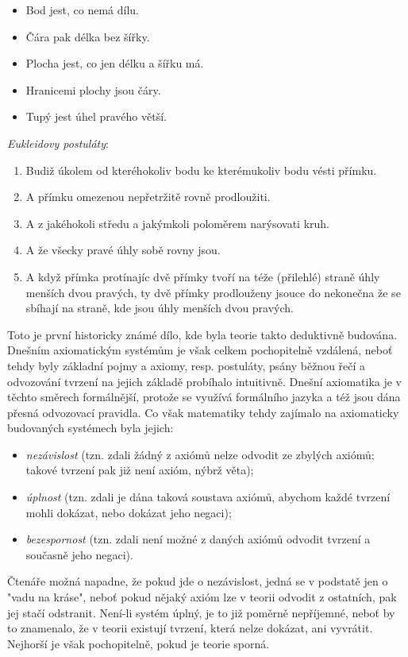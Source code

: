 \begin{itemize}
\item Bod jest, co nemá dílu.
\item Čára pak délka bez šířky.
\item Plocha jest, co jen délku a šířku má.
\item Hranicemi plochy jsou čáry.
\item Tupý jest úhel pravého větší.
\end{itemize}
\noindent \emph{Eukleidovy postuláty}:
\begin{enumerate}[label=(\roman*)]
\item Budiž úkolem od kteréhokoliv bodu ke kterémukoliv bodu vésti přímku.
\item A přímku omezenou nepřetržitě rovně prodloužiti.
\item A z jakéhokoli středu a jakýmkoli poloměrem narýsovati kruh.
\item A že všecky pravé úhly sobě rovny jsou.
\item A když přímka protínajíc dvě přímky tvoří na téže (přilehlé) straně úhly menších dvou pravých, ty dvě přímky prodlouženy jsouce do nekonečna že se sbíhají na straně, kde jsou úhly menších dvou pravých.
\end{enumerate}
Toto je první historicky známé dílo, kde byla teorie takto deduktivně budována. Dnešním axiomatickým systémům je však celkem pochopitelně vzdálená, neboť tehdy byly základní pojmy a axiomy, resp. postuláty, psány běžnou řečí a odvozování tvrzení na jejich základě probíhalo intuitivně. Dnešní axiomatika je v těchto směrech formálnější, protože se využívá formálního jazyka a též jsou dána přesná odvozovací pravidla. Co však matematiky tehdy zajímalo na axiomaticky budovaných systémech byla jejich:
\begin{itemize}
\item \emph{nezávislost} (tzn. zdali žádný z axiómů nelze odvodit ze zbylých axiómů; takové tvrzení pak již není axióm, nýbrž věta);
\item \emph{úplnost} (tzn. zdali je dána taková soustava axiómů, abychom každé tvrzení mohli dokázat, nebo dokázat jeho negaci);
\item \emph{bezespornost} (tzn. zdali není možné z daných axiómů odvodit tvrzení a současně jeho negaci).
\end{itemize}
Čtenáře možná napadne, že pokud jde o nezávislost, jedná se v podstatě jen o "vadu na kráse", neboť pokud nějaký axióm lze v teorii odvodit z ostatních, pak jej stačí odstranit. Není-li systém úplný, je to již poměrně nepříjemné, neboť by to znamenalo, že v teorii existují tvrzení, která nelze dokázat, ani vyvrátit. Nejhorší je však pochopitelně, pokud je teorie sporná.

